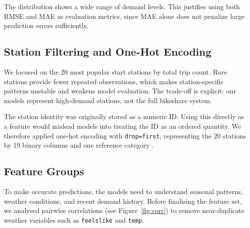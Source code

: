 The distribution shows a wide range of demand levels. This justifies 
using both RMSE and MAE as evaluation metrics, since MAE alone does not 
penalize large prediction errors sufficiently.

\subsection{Station Filtering and One-Hot Encoding}

We focused on the 20 most popular start stations by total trip count. 
Rare stations provide fewer repeated observations, which makes 
station-specific patterns unstable and weakens model evaluation. The 
trade-off is explicit: our models represent high-demand stations, not 
the full bikeshare system.

The station identity was originally stored as a numeric ID. Using this 
directly as a feature would mislead models into treating the ID as an 
ordered quantity. We therefore applied one-hot encoding with \texttt{drop=first}, representing the 20 stations by 19 binary columns and one reference category \cite{sklearn_ohe}.

\subsection{Feature Groups}

To make accurate predictions, the models need to understand seasonal 
patterns, weather conditions, and recent demand history. Before 
finalising the feature set, we analysed pairwise correlations 
(see Figure~\ref{fig:corr}) to remove near-duplicate weather variables 
such as \texttt{feelslike} and \texttt{temp}.

